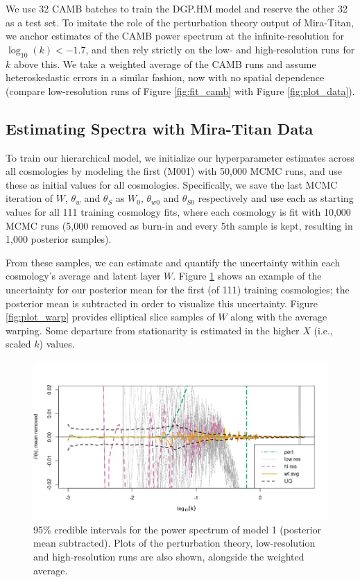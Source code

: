 \documentclass[11pt]{article}
\begin{document}
We use 32 CAMB batches to train the DGP.HM model and reserve the other 32 as a test set.
To imitate the role of the perturbation theory output of Mira-Titan, we anchor estimates of the CAMB
power spectrum at the infinite-resolution for $\log_{10}(k) < -1.7$, and then rely 
strictly on the low- and high-resolution runs for $k$ above this. We take a weighted
average of the CAMB runs and assume heteroskedastic errors in a similar fashion, now with
no spatial dependence (compare low-resolution runs of Figure \ref{fig:fit_camb} 
with Figure \ref{fig:plot_data}).

\subsection{Estimating Spectra with Mira-Titan Data}
\label{subsec:mira_fit}

To train our hierarchical model, we initialize our hyperparameter estimates across 
all cosmologies by modeling the first (M001) with 50,000 MCMC runs, and use these 
as initial values for all cosmologies. Specifically, we save the last MCMC 
iteration of $W$, $\theta_w$ and $\theta_S$ as $W_0$, $\theta_{w0}$ and $\theta_{S0}$ 
respectively and use each as starting values for all 111 training cosmology fits, 
where each cosmology is fit with 10,000 MCMC runs (5,000 removed as burn-in and 
every 5th sample is kept, resulting in 1,000 posterior samples).

From these samples, we can estimate and quantify the uncertainty within each 
cosmology's average and latent layer $W$. Figure \ref{fig:plot_fit} shows an 
example of the uncertainty for our posterior mean for the first (of 111) training 
cosmologies; the posterior mean is subtracted in order to visualize this uncertainty. 
Figure \ref{fig:plot_warp} provides elliptical slice samples of $W$ along with the 
average warping. Some departure from stationarity is estimated in the higher $X$ 
(i.e., scaled $k$) values.

\begin{figure}[ht]
    \centering
    \includegraphics[width=6in]{plot_fit.png}
    \caption{95\% credible intervals for the power spectrum of model 1 (posterior mean 
             subtracted). Plots of the perturbation theory, low-resolution and high-resolution 
             runs are also shown, alongside the weighted average.}
    \label{fig:plot_fit}
\end{figure}
\end{document}
